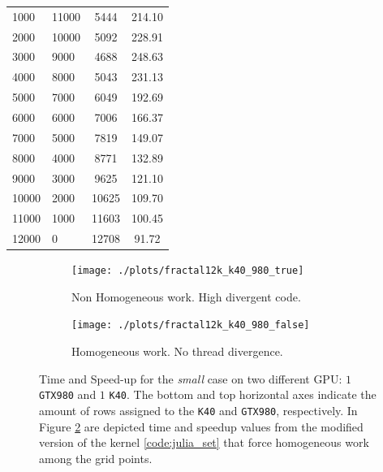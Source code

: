 \begin{table}[!htb]
\begin{subtable}{.5\linewidth}
\begin{tabular}{@{}LLCC@{}}
				1000  & 11000 & 5444  & 214.10 \\
				2000  & 10000 & 5092  & 228.91 \\
				3000  & 9000  & 4688  & 248.63 \\
				4000  & 8000  & 5043  & 231.13 \\
				5000  & 7000  & 6049  & 192.69 \\
				6000  & 6000  & 7006  & 166.37 \\
				7000  & 5000  & 7819  & 149.07 \\
				8000  & 4000  & 8771  & 132.89 \\
				9000  & 3000  & 9625  & 121.10 \\
				10000 & 2000  & 10625 & 109.70 \\
				11000 & 1000  & 11603 & 100.45 \\
				12000 & 0     & 12708 & 91.72
				 \\ 
			\bottomrule
		\end{tabular}
	\end{subtable} 
\end{table}
 

 
 
 \begin{figure}
 	
 	\begin{subfigure}{1.0\textwidth}
 		\caption{Non Homogeneous work. High divergent code.}
 		\texttt{[image: ./plots/fractal12k\_k40\_980\_true]}
 		\label{fig:julia_two_GPU_true}
 		
 	\end{subfigure}		
 	\endminipage\hfill
 	\vspace{5mm}
 	\begin{subfigure}{1.0\textwidth}
 			\caption{Homogeneous work. No thread divergence.}
 		\texttt{[image: ./plots/fractal12k\_k40\_980\_false]}
 		\label{fig:julia_two_GPU_false}
 	
 	\end{subfigure}
 	\endminipage\hfill
	
 	\caption[Time in red (lower is better) and speed-up in blue (higher is better) for the \textit{small} case on two different GPU: $1$ \texttt{GTX980} and $1$ \texttt{K40}.]{Time and Speed-up for the \textit{small} case on two different GPU: $1$ \texttt{GTX980} and $1$ \texttt{K40}. The bottom and top horizontal axes indicate the amount of rows assigned to the \texttt{K40} and \texttt{GTX980}, respectively. In Figure \ref{fig:julia_two_GPU_false} are depicted time and speedup values from the modified version of the kernel \ref{code:julia_set} that force homogeneous work among the grid points.  }
 	\label{fig:julia_two_GPU}
 \end{figure}

